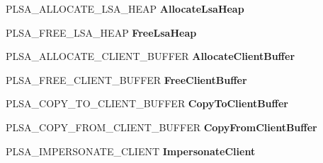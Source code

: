 \begin{DoxyCompactItemize}
\item 
\mbox{\label{struct___l_s_a___s_e_c_p_k_g___f_u_n_c_t_i_o_n___t_a_b_l_e_a04a5babfa33007770bf53674964edf55}} 
P\+L\+S\+A\+\_\+\+A\+L\+L\+O\+C\+A\+T\+E\+\_\+\+L\+S\+A\+\_\+\+H\+E\+AP {\bfseries Allocate\+Lsa\+Heap}
\item 
\mbox{\label{struct___l_s_a___s_e_c_p_k_g___f_u_n_c_t_i_o_n___t_a_b_l_e_abeb29681347cdbc53fd6cbe12418de35}} 
P\+L\+S\+A\+\_\+\+F\+R\+E\+E\+\_\+\+L\+S\+A\+\_\+\+H\+E\+AP {\bfseries Free\+Lsa\+Heap}
\item 
\mbox{\label{struct___l_s_a___s_e_c_p_k_g___f_u_n_c_t_i_o_n___t_a_b_l_e_a026fa0914f6ddee6806c6b1872584a7f}} 
P\+L\+S\+A\+\_\+\+A\+L\+L\+O\+C\+A\+T\+E\+\_\+\+C\+L\+I\+E\+N\+T\+\_\+\+B\+U\+F\+F\+ER {\bfseries Allocate\+Client\+Buffer}
\item 
\mbox{\label{struct___l_s_a___s_e_c_p_k_g___f_u_n_c_t_i_o_n___t_a_b_l_e_a996561631a45ae97b709061ad3003ea9}} 
P\+L\+S\+A\+\_\+\+F\+R\+E\+E\+\_\+\+C\+L\+I\+E\+N\+T\+\_\+\+B\+U\+F\+F\+ER {\bfseries Free\+Client\+Buffer}
\item 
\mbox{\label{struct___l_s_a___s_e_c_p_k_g___f_u_n_c_t_i_o_n___t_a_b_l_e_a24db27d6b78438eefbbba2e58c4e55ab}} 
P\+L\+S\+A\+\_\+\+C\+O\+P\+Y\+\_\+\+T\+O\+\_\+\+C\+L\+I\+E\+N\+T\+\_\+\+B\+U\+F\+F\+ER {\bfseries Copy\+To\+Client\+Buffer}
\item 
\mbox{\label{struct___l_s_a___s_e_c_p_k_g___f_u_n_c_t_i_o_n___t_a_b_l_e_aa771cc42b73059afe8c8b3eb7d1251fb}} 
P\+L\+S\+A\+\_\+\+C\+O\+P\+Y\+\_\+\+F\+R\+O\+M\+\_\+\+C\+L\+I\+E\+N\+T\+\_\+\+B\+U\+F\+F\+ER {\bfseries Copy\+From\+Client\+Buffer}
\item 
\mbox{\label{struct___l_s_a___s_e_c_p_k_g___f_u_n_c_t_i_o_n___t_a_b_l_e_aaa257f7a9415df3e0e3db7280b168777}} 
P\+L\+S\+A\+\_\+\+I\+M\+P\+E\+R\+S\+O\+N\+A\+T\+E\+\_\+\+C\+L\+I\+E\+NT {\bfseries Impersonate\+Client}

\end{DoxyCompactItemize}
